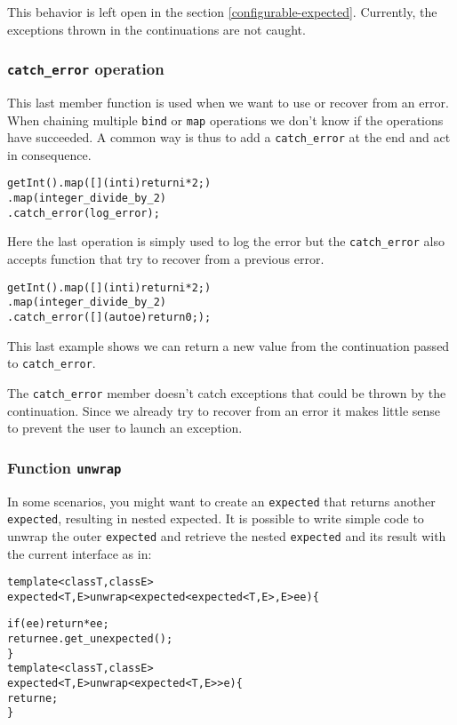 \documentclass[a4paper,10pt]{article}
\newcommand{\cpp}[1]{\lstinline{#1}}
\begin{document}
This behavior is left open in the section \ref{configurable-expected}. Currently, the exceptions thrown in the continuations are not caught.

\subsubsection{\cpp{catch_error} operation}

This last member function is used when we want to use or recover from an error. When chaining multiple \cpp{bind} or \cpp{map} operations we don't know if the operations have succeeded. A common way is thus to add a \cpp{catch_error} at the end and act in consequence.

\begin{alltt}
getInt().map([](int i){return i * 2;})
        .map(integer_divide_by_2)
        .catch_error(log_error);
\end{alltt}

\noindent
Here the last operation is simply used to log the error but the \cpp{catch_error} also accepts function that try to recover from a previous error.

\begin{alltt}
getInt().map([](int i){return i * 2;})
        .map(integer_divide_by_2)
        .catch_error([](auto e) { return 0; });
\end{alltt}
\noindent
This last example shows we can return a new value from the continuation passed to \cpp{catch_error}.
\newline

The \cpp{catch_error} member doesn't catch exceptions that could be thrown by the continuation. Since we already try to recover from an error it makes little sense to prevent the user to launch an exception.

\subsubsection{Function \cpp{unwrap}}

In some scenarios, you might want to create an \cpp{expected} that returns another \cpp{expected}, resulting in nested expected. It is possible to write simple code to unwrap the outer \cpp{expected} and retrieve the nested \cpp{expected} and its result with the current interface as in:

\begin{alltt}
template <class T, class E>
expected<T,E> unwrap<expected<expected<T,E>,E> ee) \{

  if (ee) return *ee;
  return ee.get_unexpected();
\}
template <class T, class E>
expected<T,E> unwrap<expected<T,E>> e) \{ 
  return e;
\}
\end{alltt}
\end{document}
